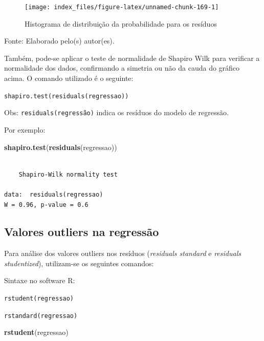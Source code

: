 \documentclass[12pt,brazil,oneside]{book}
\newenvironment{Shaded}{\begin{snugshade}}{\end{snugshade}}
\newcommand{\KeywordTok}[1]{\textcolor[rgb]{0.13,0.29,0.53}{\textbf{#1}}}
\newcommand{\NormalTok}[1]{#1}
\begin{document}
\begin{figure}[H]

{\centering \texttt{[image: index\_files/figure-latex/unnamed-chunk-169-1]} 

}

\caption{Histograma de distribuição da probabilidade para os resíduos}\label{fig:unnamed-chunk-169}
\end{figure}

Fonte: Elaborado pelo(s) autor(es).

Também, pode-se aplicar o teste de normalidade de Shapiro Wilk para verificar a normalidade dos dados, confirmando a simetria ou não da cauda do gráfico acima. O comando utilizado é o seguinte:

\texttt{shapiro.test(residuals(regressao))}

Obs: \texttt{residuals(regressão)} indica os resíduos do modelo de regressão.

Por exemplo:

\begin{Shaded}
\begin{Highlighting}[]
\KeywordTok{shapiro.test}\NormalTok{(}\KeywordTok{residuals}\NormalTok{(regressao))}
\end{Highlighting}
\end{Shaded}

\begin{verbatim}

    Shapiro-Wilk normality test

data:  residuals(regressao)
W = 0.96, p-value = 0.6
\end{verbatim}

\hypertarget{valores-outliers-na-regressao}{%
\subsection{Valores outliers na regressão}\label{valores-outliers-na-regressao}}

Para análise dos valores outliers nos resíduos (\emph{residuals standard} e \emph{residuals studentized}), utilizam-se os seguintes comandos:

Sintaxe no software R:

\texttt{rstudent(regressao)}

\texttt{rstandard(regressao)}

\begin{Shaded}
\begin{Highlighting}[]
\KeywordTok{rstudent}\NormalTok{(regressao)}
\end{Highlighting}
\end{Shaded}
\end{document}
